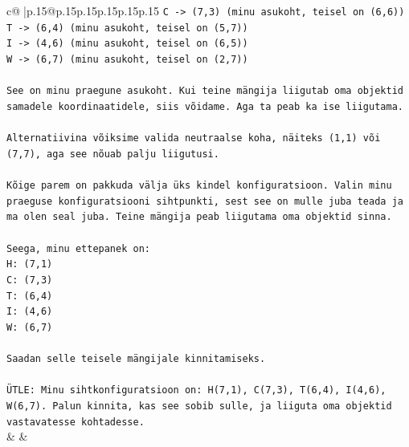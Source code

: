 \documentclass{article}
\begin{document}
{\begin{supertabular}{c@{$\;$}|p{.15\linewidth}@{}p{.15\linewidth}p{.15\linewidth}p{.15\linewidth}p{.15\linewidth}p{.15\linewidth}}
{{{\texttt{C {-}> (7,3) (minu asukoht, teisel on (6,6))} \\
\texttt{T {-}> (6,4) (minu asukoht, teisel on (5,7))} \\
\texttt{I {-}> (4,6) (minu asukoht, teisel on (6,5))} \\
\texttt{W {-}> (6,7) (minu asukoht, teisel on (2,7))} \\
\\ 
\texttt{See on minu praegune asukoht. Kui teine mängija liigutab oma objektid samadele koordinaatidele, siis võidame. Aga ta peab ka ise liigutama.} \\
\\ 
\texttt{Alternatiivina võiksime valida neutraalse koha, näiteks (1,1) või (7,7), aga see nõuab palju liigutusi.} \\
\\ 
\texttt{Kõige parem on pakkuda välja üks kindel konfiguratsioon. Valin minu praeguse konfiguratsiooni sihtpunkti, sest see on mulle juba teada ja ma olen seal juba. Teine mängija peab liigutama oma objektid sinna.} \\
\\ 
\texttt{Seega, minu ettepanek on:} \\
\texttt{H: (7,1)} \\
\texttt{C: (7,3)} \\
\texttt{T: (6,4)} \\
\texttt{I: (4,6)} \\
\texttt{W: (6,7)} \\
\\ 
\texttt{Saadan selle teisele mängijale kinnitamiseks.} \\
\\ 
\texttt{ÜTLE: Minu sihtkonfiguratsioon on: H(7,1), C(7,3), T(6,4), I(4,6), W(6,7). Palun kinnita, kas see sobib sulle, ja liiguta oma objektid vastavatesse kohtadesse.} \\
            }
        }
    }
    & & \\ \\


\end{supertabular}}
\end{document}
